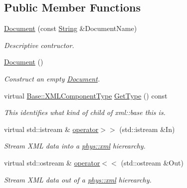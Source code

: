 \subsection*{Public Member Functions}
\begin{DoxyCompactItemize}
\item 
\hyperlink{classphys_1_1xml_1_1Document_ad88f5ad89aebcb160362d4e18f41e54b}{Document} (const \hyperlink{namespacephys_aa03900411993de7fbfec4789bc1d392e}{String} \&DocumentName)
\begin{DoxyCompactList}\small\item\em Descriptive contructor. \item\end{DoxyCompactList}\item 
\hypertarget{classphys_1_1xml_1_1Document_ae1e779f0826bf3357ff77846155aad7d}{
\hyperlink{classphys_1_1xml_1_1Document_ae1e779f0826bf3357ff77846155aad7d}{Document} ()}
\label{dd/d44/classphys_1_1xml_1_1Document_ae1e779f0826bf3357ff77846155aad7d}

\begin{DoxyCompactList}\small\item\em Construct an empty \hyperlink{classphys_1_1xml_1_1Document}{Document}. \item\end{DoxyCompactList}\item 
virtual \hyperlink{classphys_1_1xml_1_1Base_a62ba0484b5ecb502f9ae9d82d3720320}{Base::XMLComponentType} \hyperlink{classphys_1_1xml_1_1Document_a4553060dd4c962435f86ce89b7ba1df4}{GetType} () const 
\begin{DoxyCompactList}\small\item\em This identifies what kind of child of xml::base this is. \item\end{DoxyCompactList}\item 
virtual std::istream \& \hyperlink{classphys_1_1xml_1_1Document_ae707cd7a4bee09fbaf1c21a0aa33db8b}{operator$>$$>$} (std::istream \&In)
\begin{DoxyCompactList}\small\item\em Stream XML data into a \hyperlink{namespacephys_1_1xml}{phys::xml} hierearchy. \item\end{DoxyCompactList}\item 
virtual std::ostream \& \hyperlink{classphys_1_1xml_1_1Document_a1406643af2c306031b599950902d0494}{operator$<$$<$} (std::ostream \&Out)
\begin{DoxyCompactList}\small\item\em Stream XML data out of a \hyperlink{namespacephys_1_1xml}{phys::xml} hierearchy. \item\end{DoxyCompactList}\end{DoxyCompactItemize}
